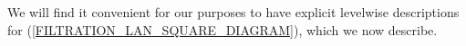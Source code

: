 \documentclass[a4paper,10pt]{article}%
\begin{document}
We will find it convenient for our purposes to 
have explicit levelwise descriptions for 
(\ref{FILTRATION_LAN_SQUARE_DIAGRAM}),
which we now describe.





\end{document}
